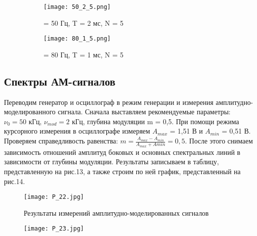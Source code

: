 \begin{figure}{\textwidth}
\begin{subfigure}{.5\textwidth}
    \centering
    \texttt{[image: 50\_2\_5.png]}
    \caption{\nu = 50 Гц, T = 2 мс, N = 5}
    \label{fig:table1}
\end{subfigure}%
\begin{subfigure}{.5\textwidth}
    \centering
    \texttt{[image: 80\_1\_5.png]}
    \caption{\nu = 80 Гц, T = 1 мс, N = 5}
    \label{fig:table1}
\end{subfigure}
\caption{}
\end{figure}

\subsection{Спектры АМ-сигналов}
Переводим генератор и осциллограф в режим генерации и измерения амплитудно-моделированного сигнала. Сначала выставляем рекомендуемые параметры: $\nu_0 = 50$ кГц, $\nu_{mod} = 2$ кГц, глубина модуляции m = 0,5. При помощи режима курсорного измерения в осциллографе измеряем $A_{max}$ = 1,51 В и $A_{min}$ = 0,51 В. Проверяем справедливость равенства: $m = \frac{A_{max} - A_{min}}{A_{max} + A{min}} = 0,5$.
После этого снимаем зависимость отношений амплитуд боковых и основных спектральных линий в зависимости от глубины модуляции. Результаты записываем в таблицу, представленную на рис.13, а также строим по ней график, представленный на рис.14.
\begin{figure}[h]
    \centering
    \texttt{[image: P\_22.jpg]}
    \caption{Результаты измерений амплитудно-моделированных сигналов}
    \label{fig:table1}
\end{figure}
\begin{figure}[h]
    \centering
    \texttt{[image: P\_23.jpg]}
    \caption{}
    \label{fig:table1}
\end{figure}
